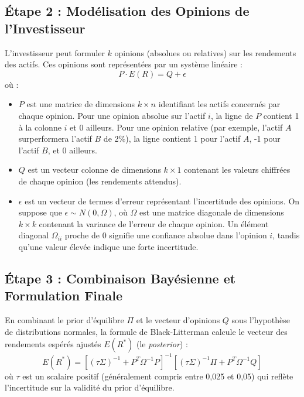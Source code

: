 \subsection{Étape 2 : Modélisation des Opinions de l'Investisseur}
L'investisseur peut formuler $k$ opinions (absolues ou relatives) sur les rendements des actifs. Ces opinions sont représentées par un système linéaire :
\begin{equation}
    P \cdot E(R) = Q + \epsilon
\end{equation}
où :
\begin{itemize}
    \item $P$ est une matrice de dimensions $k \times n$ identifiant les actifs concernés par chaque opinion. Pour une opinion absolue sur l'actif $i$, la ligne de $P$ contient 1 à la colonne $i$ et 0 ailleurs. Pour une opinion relative (par exemple, l'actif $A$ surperformera l'actif $B$ de 2\%), la ligne contient 1 pour l'actif $A$, -1 pour l'actif $B$, et 0 ailleurs.
    \item $Q$ est un vecteur colonne de dimensions $k \times 1$ contenant les valeurs chiffrées de chaque opinion (les rendements attendus).
    \item $\epsilon$ est un vecteur de termes d'erreur représentant l'incertitude des opinions. On suppose que $\epsilon \sim N(0, \Omega)$, où $\Omega$ est une matrice diagonale de dimensions $k \times k$ contenant la variance de l'erreur de chaque opinion. Un élément diagonal $\Omega_{ii}$ proche de 0 signifie une confiance absolue dans l'opinion $i$, tandis qu'une valeur élevée indique une forte incertitude.
\end{itemize}

\subsection{Étape 3 : Combinaison Bayésienne et Formulation Finale}
En combinant le prior d'équilibre $\Pi$ et le vecteur d'opinions $Q$ sous l'hypothèse de distributions normales, la formule de Black-Litterman calcule le vecteur des rendements espérés ajustés $E(R^*)$ (le \textit{posterior}) :
\begin{equation}
    E(R^*) = \left[ (\tau \Sigma)^{-1} + P^T \Omega^{-1} P \right]^{-1} \left[ (\tau \Sigma)^{-1} \Pi + P^T \Omega^{-1} Q \right]
\end{equation}
où $\tau$ est un scalaire positif (généralement compris entre 0,025 et 0,05) qui reflète l'incertitude sur la validité du prior d'équilibre. 

